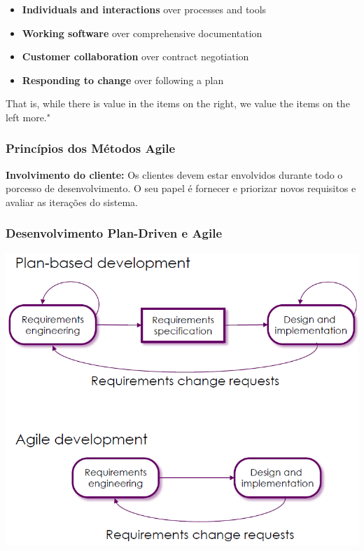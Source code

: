 \documentclass{article}
\begin{document}
\begin{itemize}
  \item \textbf{Individuals and interactions} over processes and tools
  \item \textbf{Working software} over comprehensive documentation
  \item \textbf{Customer collaboration} over contract negotiation
  \item \textbf{Responding to change} over following a plan
\end{itemize}

That is, while there is value in the items on the right,
we value the items on the left more."

\subsubsection{Princípios dos Métodos Agile}

\begin{flushleft}
  \textbf{Involvimento do cliente:} Os clientes devem estar envolvidos
  durante todo o porcesso de desenvolvimento. O seu papel é fornecer
  e priorizar novos requisitos e avaliar as iterações do sistema.
\end{flushleft}

\subsubsection{Desenvolvimento Plan-Driven e Agile}

\begin{center}
  \includegraphics[scale=0.4]{19}
\end{center}
\end{document}
